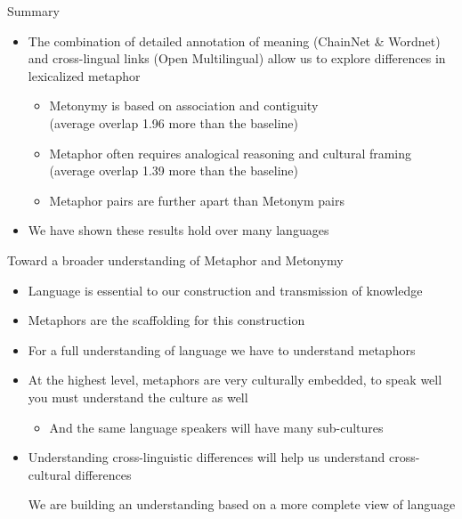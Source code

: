 \documentclass[xetex]{beamer}
\begin{document}
\begin{frame}{Summary}
  
\begin{itemize}
\item The combination of detailed annotation of meaning (ChainNet \& Wordnet) and
  cross-lingual links (Open Multilingual) allow us to explore differences in lexicalized metaphor
  \begin{itemize}
  \item  Metonymy is based on association and contiguity
    \\  (average overlap 1.96 more than the baseline)
  \item  Metaphor often requires analogical reasoning and cultural framing
    \\  (average overlap 1.39 more than the baseline)
  \item Metaphor pairs are further apart than Metonym pairs
  \end{itemize}
\item We have shown these results hold over many languages

\end{itemize}

\end{frame}

\begin{frame}{Toward a broader understanding of Metaphor and Metonymy}
  \begin{itemize}
  \item Language is essential to our construction and transmission of knowledge
  \item Metaphors are the scaffolding for this construction
  \item For a full understanding of language we have to understand metaphors
  \item At the highest level, metaphors are very culturally embedded, to speak well you must understand the culture as well
    \begin{itemize}
    \item And the same language speakers will have many sub-cultures
    \end{itemize}
  \item Understanding cross-linguistic differences will help us understand cross-cultural differences
    \begin{center}
      \large We are building an understanding based on a more complete view of language
    \end{center}
  \end{itemize}
\end{frame}
\end{document}

